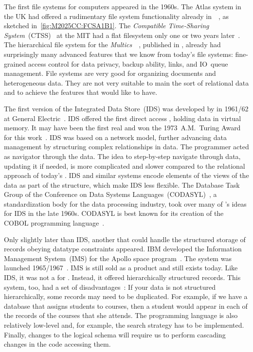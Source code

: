 The first file systems for computers appeared in the 1960s.
The Atlas system in the UK had offered a rudimentary file system functionality already in~\citeyear{KPH1961TAS}~\cite{KPH1961TAS,M2025CC:FCSA1B1}, as sketched in~\cref{fig:M2025CC:FCSA1B1}.
The  \emph{Compatible Time-Sharing System}~(CTSS)~\cite{CMDDCHOK1963TCTSSAPG} at the MIT had a flat filesystem only one or two years later~\cite{OD1963TCCSLABTCDE}.
The hierarchical file system for the \emph{Multics}~~\cite{CV1965IAOOTMS}, published in \citeyear{DN1965AGPFSFSS}, already had surprisingly many advanced features that we know from today's file systems: fine-grained access control for data privacy, backup ability, links, and IO~queue management.
File systems are very good for organizing documents and heterogeneous data.
They are not very suitable to main the sort of relational data and to achieve the features that would like  to have.

The first version of the Integrated Data Store~(IDS) was developed by \citeauthor{B2009TOOTIDSITFDAD} in 1961/62 at General Electric~\cite{B2009TOOTIDSITFDAD,B1965SFRAP}.
IDS offered the first direct access , holding data in virtual memory.
It may have been the first real  and \citeauthor{B2009TOOTIDSITFDAD} won the 1973~A.M.~Turing Award for this work~\cite{H2016HCBITDAFOODW}.
IDS was based on a network model, further advancing data management by structuring complex relationships in data.
The programmer acted as navigator through the data.
The idea to step-by-step navigate through data, updating it if needed, is more complicated and slower compared to the relational approach of today's .
IDS and similar systems encode elements of the views of the data as part of the  structure, which make IDS less flexible.
The Database Task Group of the Conference on Data Systems Languages~(CODASYL)~\cite{TF1976CDBMS}, a standardization body for the data processing industry, took over many of \citeauthor{B2009TOOTIDSITFDAD}'s ideas for IDS in the late 1960s.
CODASYL is best known for its creation of the COBOL programming language~\cite{H2016HCBITDAFOODW}.

Only slightly later than IDS, another  that could handle the structured storage of records obeying datatype constraints appeared.
IBM developed the Information Management System~(IMS) for the Apollo space program~\cite{KLBGNLWBS2012ITIYCGTIIMS}.
The system was launched 1965/1967~\cite{BBP2007TBOI}.
IMS is still sold as a product and still exists today.
Like IDS, it was not a  for \emph{}.
Instead, it offered hierarchically structured records.
This system, too, had a set of disadvantages~\cite{KC2024DS:ITD}:
If your data is not structured hierarchically, some records may need to be duplicated.
For example, if we have a database that assigns students to courses, then a student would appear in each of the records of the courses that she attends.
The programming language is also relatively low-level and, for example, the search strategy has to be implemented.
Finally, changes to the logical schema will require us to perform cascading changes in the code accessing them.

